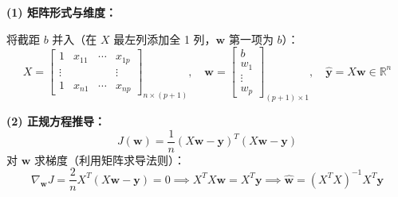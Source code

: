 \documentclass[a4paper,11pt]{ctexart}
\begin{document}
\begin{solutionbox}[参考答案与详细解析]
    \textbf{(1) 矩阵形式与维度：}

    将截距 $b$ 并入（在 $X$ 最左列添加全 1 列，$\boldsymbol{w}$ 第一项为 $b$）：
    \[
    X = \begin{bmatrix}1 & x_{11} & \cdots & x_{1p}\\ \vdots & & & \vdots\\ 1 & x_{n1} & \cdots & x_{np}\end{bmatrix}_{n\times(p+1)}, \quad
    \boldsymbol{w} = \begin{bmatrix}b\\w_1\\\vdots\\w_p\end{bmatrix}_{(p+1)\times 1}, \quad
    \hat{\boldsymbol{y}} = X\boldsymbol{w} \in \mathbb{R}^n
    \]

    \textbf{(2) 正规方程推导：}
    \[
    J(\boldsymbol{w}) = \frac{1}{n}(X\boldsymbol{w}-\boldsymbol{y})^T(X\boldsymbol{w}-\boldsymbol{y})
    \]
    对 $\boldsymbol{w}$ 求梯度（利用矩阵求导法则）：
    \[
    \nabla_{\boldsymbol{w}}J = \frac{2}{n}X^T(X\boldsymbol{w}-\boldsymbol{y}) = 0
    \implies X^TX\boldsymbol{w} = X^T\boldsymbol{y}
    \implies \boxed{\hat{\boldsymbol{w}} = (X^TX)^{-1}X^T\boldsymbol{y}}
    \]


\end{solutionbox}
\end{document}
